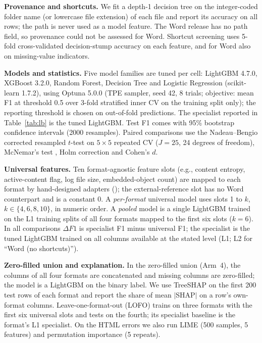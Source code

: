 \documentclass[conference]{IEEEtran}
\newcommand{\ft}[1]{\texttt{\detokenize{#1}}}
\begin{document}
\textbf{Provenance and shortcuts.} We fit a depth-1 decision tree on the integer-coded folder name (or lowercase file extension) of each file and report its accuracy on all rows; the path is never used as a model feature. The Word release has no path field, so provenance could not be assessed for Word. Shortcut screening uses 5-fold cross-validated decision-stump accuracy on each feature, and for Word also on missing-value indicators.

\textbf{Models and statistics.} Five model families are tuned per cell: LightGBM \cite{ke2017} 4.7.0, XGBoost 3.2.0, Random Forest, Decision Tree and Logistic Regression (scikit-learn 1.7.2), using Optuna \cite{akiba2019} 5.0.0 (TPE sampler, seed 42, 8 trials; objective: mean F1 at threshold 0.5 over 3-fold stratified inner CV on the training split only); the reporting threshold is chosen on out-of-fold predictions. The specialist reported in Table~\ref{tab:lb} is the tuned LightGBM. Test F1 comes with 95\% bootstrap confidence intervals \cite{efron1979} (2000 resamples). Paired comparisons use the Nadeau--Bengio corrected resampled $t$-test \cite{nadeau2003} on $5\times5$ repeated CV ($J=25$, 24 degrees of freedom), McNemar's test \cite{mcnemar1947}, Holm correction \cite{holm1979} and Cohen's $d$.

\textbf{Universal features.} Ten format-agnostic feature slots (e.g., content entropy, active-content flag, log file size, embedded-object count) are mapped to each format by hand-designed adapters (\ft{mapping_log.json}); the external-reference slot has no Word counterpart and is a constant 0. A \emph{per-format} universal model uses slots 1 to $k$, $k\in\{4,6,8,10\}$, in numeric order. A \emph{pooled} model is a single LightGBM trained on the L1 training splits of all four formats mapped to the first six slots ($k=6$). In all comparisons $\Delta F1$ is specialist F1 minus universal F1; the specialist is the tuned LightGBM trained on all columns available at the stated level (L1; L2 for ``Word (no shortcuts)'').

\textbf{Zero-filled union and explanation.} In the zero-filled union (Arm~4), the columns of all four formats are concatenated and missing columns are zero-filled; the model is a LightGBM on the binary label. We use TreeSHAP \cite{lundberg2017} on the first 200 test rows of each format and report the share of mean $|$SHAP$|$ on a row's own-format columns. Leave-one-format-out (LOFO) trains on three formats with the first six universal slots and tests on the fourth; its specialist baseline is the format's L1 specialist. On the HTML errors we also run LIME \cite{ribeiro2016} (500 samples, 5 features) and permutation importance (5 repeats).
\end{document}
